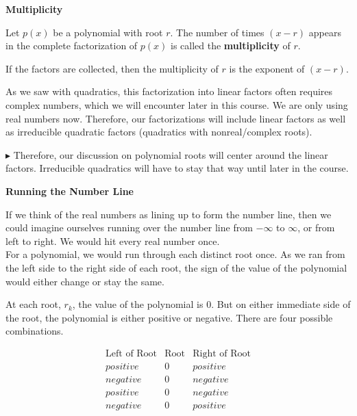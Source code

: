 \documentclass{ximera}
\begin{document}
\begin{definition} \textbf{\textcolor{green!50!black}{Multiplicity}} 

Let $p(x)$ be a polynomial with root $r$.  The number of times $(x - r)$ appears in the complete factorization of $p(x)$ is called the \textbf{multiplicity} of $r$.

If the factors are collected, then the multiplicity of $r$ is the exponent of $(x-r)$.

\end{definition}

As we saw with quadratics, this factorization into linear factors often requires complex numbers, which we will encounter later in this course. We are only using real numbers now.  Therefore, our factorizations will include linear factors as well as irreducible quadratic factors (quadratics with nonreal/complex roots).


\textbf{\textcolor{red!70!darkgray}{$\blacktriangleright$}}  Therefore, our discussion on polynomial roots will center around the linear factors.  Irreducible quadratics will have to stay that way until later in the course.









\textbf{\large Running the Number Line}

If we think of the real numbers as lining up to form the number line, then we could imagine ourselves running over the number line from $-\infty$ to $\infty$, or from left to right.  We would hit every real number once.  \\

For a polynomial, we would run through each distinct root once.  As we ran from the left side to the right side of each root, the sign of the value of the polynomial would either change or stay the same.

At each root, $r_k$, the value of the polynomial is $0$.  But on either immediate side of the root, the polynomial is either positive or negative. There are four possible combinations.


\[
\begin{array}{rcl}
\text{Left of Root}  & \text{Root}  & \text{Right of Root} \\
positive & 0 & positive \\
negative & 0 & negative \\
positive & 0 & negative \\
negative & 0 & positive
\end{array}
\]
\end{document}
